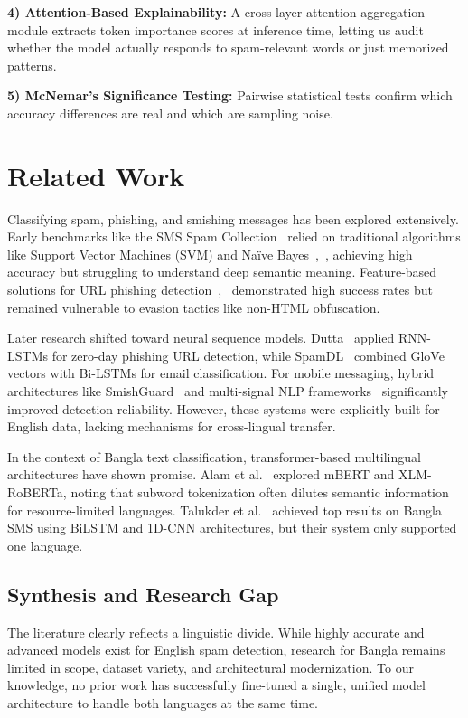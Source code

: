 \documentclass[journal]{IEEEtran}
\begin{document}
\textbf{4) Attention-Based Explainability:} A cross-layer attention aggregation module extracts token importance scores at inference time, letting us audit whether the model actually responds to spam-relevant words or just memorized patterns.

\textbf{5) McNemar's Significance Testing:} Pairwise statistical tests confirm which accuracy differences are real and which are sampling noise.

\section{Related Work}

Classifying spam, phishing, and smishing messages has been explored extensively. Early benchmarks like the SMS Spam Collection~\cite{ref1} relied on traditional algorithms like Support Vector Machines (SVM) and Naïve Bayes~\cite{ref1},~\cite{ref5}, achieving high accuracy but struggling to understand deep semantic meaning. Feature-based solutions for URL phishing detection~\cite{ref2},~\cite{ref8} demonstrated high success rates but remained vulnerable to evasion tactics like non-HTML obfuscation.

Later research shifted toward neural sequence models. Dutta~\cite{ref3} applied RNN-LSTMs for zero-day phishing URL detection, while SpamDL~\cite{ref9} combined GloVe vectors with Bi-LSTMs for email classification. For mobile messaging, hybrid architectures like SmishGuard~\cite{ref6} and multi-signal NLP frameworks~\cite{ref10} significantly improved detection reliability. However, these systems were explicitly built for English data, lacking mechanisms for cross-lingual transfer.

In the context of Bangla text classification, transformer-based multilingual architectures have shown promise. Alam et al.~\cite{ref4} explored mBERT and XLM-RoBERTa, noting that subword tokenization often dilutes semantic information for resource-limited languages. Talukder et al.~\cite{ref7} achieved top results on Bangla SMS using BiLSTM and 1D-CNN architectures, but their system only supported one language.

\subsection{Synthesis and Research Gap}

The literature clearly reflects a linguistic divide. While highly accurate and advanced models exist for English spam detection, research for Bangla remains limited in scope, dataset variety, and architectural modernization. To our knowledge, no prior work has successfully fine-tuned a single, unified model architecture to handle both languages at the same time.
\end{document}
